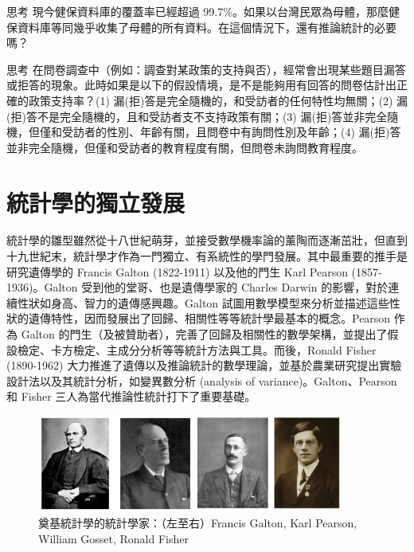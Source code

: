     \bigskip
    
    \begin{custom}{思考}
        現今健保資料庫的覆蓋率已經超過 99.7\%。如果以台灣民眾為母體，那麼健保資料庫等同幾乎收集了母體的所有資料。在這個情況下，還有推論統計的必要嗎？
    \end{custom}
    
    \bigskip
    
    \begin{custom}{思考}
        在問卷調查中（例如：調查對某政策的支持與否），經常會出現某些題目漏答或拒答的現象。此時如果是以下的假設情境，是不是能夠用有回答的問卷估計出正確的政策支持率？(1) 漏(拒)答是完全隨機的，和受訪者的任何特性均無關；(2) 漏(拒)答不是完全隨機的，且和受訪者支不支持政策有關；(3) 漏(拒)答並非完全隨機，但僅和受訪者的性別、年齡有關，且問卷中有詢問性別及年齡；(4) 漏(拒)答並非完全隨機，但僅和受訪者的教育程度有關，但問卷未詢問教育程度。
    \end{custom}
    
\section{統計學的獨立發展}

    統計學的雛型雖然從十八世紀萌芽，並接受數學機率論的薰陶而逐漸茁壯，但直到十九世紀末，統計學才作為一門獨立、有系統性的學門發展。其中最重要的推手是研究遺傳學的 Francis Galton (1822-1911) 以及他的門生 Karl Pearson (1857-1936)。Galton 受到他的堂哥、也是遺傳學家的 Charles Darwin 的影響，對於連續性狀如身高、智力的遺傳感興趣。Galton 試圖用數學模型來分析並描述這些性狀的遺傳特性，因而發展出了回歸、相關性等等統計學最基本的概念。Pearson 作為 Galton 的門生（及被贊助者），完善了回歸及相關性的數學架構，並提出了假設檢定、卡方檢定、主成分分析等等統計方法與工具。而後，Ronald Fisher (1890-1962) 大力推進了遺傳以及推論統計的數學理論，並基於農業研究提出實驗設計法以及其統計分析，如變異數分析 (analysis of variance)。Galton、Pearson 和 Fisher 三人為當代推論性統計打下了重要基礎。
    
    \begin{figure}[htbp]
      \centering
      \includegraphics[width=0.9\textwidth]{figures/01-Overview/statisticians.png}
      \caption{奠基統計學的統計學家：（左至右）Francis Galton, Karl Pearson, William Gosset, Ronald Fisher}
      \label{fig:statisticians}
    \end{figure}